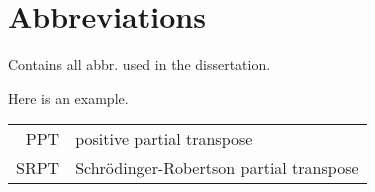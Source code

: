 \chapter*{Abbreviations} 

Contains all abbr. used in the dissertation.

Here is an example.

\begin{longtable}{rl}
PPT & positive partial transpose\\
SRPT & Schr\"odinger-Robertson partial transpose
\end{longtable}